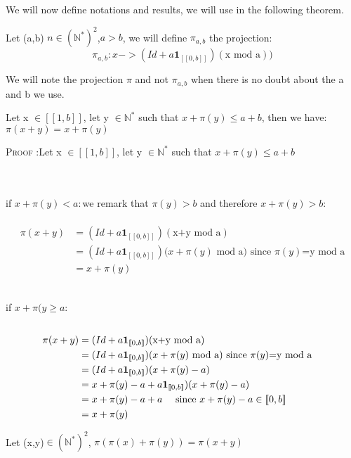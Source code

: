 We will now define notations and results, we will use in the following theorem. 

\begin{notation}

Let (a,b) \(n \in (\mathbb{N}^*)^2\),\(a>b\), we will define \(\pi_{a,b}\) the projection:
\[ \pi_{a,b}:x->(Id+a\mathbf{1}_{ [\![0,b]\!]})(\text{x mod a}))\]
\end{notation}
 
We will note  the projection \(\pi\) and not \(\pi_{a,b}\) when there is no doubt about the a and b we use.

\begin{proposition}
Let x \(\in [\![1,b]\!]\), let y \(\in \mathbb{N}^*\) such that \(x+\pi(y)\leqslant a+b\), then we have: \(\pi(x+y)=x+\pi(y)\)
\end{proposition}

\textsc{Proof :}Let x \(\in [\![1,b]\!]\), let y \(\in \mathbb{N}^*\) such that \(x+\pi(y)\leqslant a+b\)

\\\\if \(x+\pi(y)< a:\)we remark that \(\pi(y)>b\) and therefore \(x+\pi(y)>b\):

\begin{align*}
 \\\pi(x+y) & = (Id+a\mathbf{1}_{ [\![0,b]\!]})(\text{x+y mod a})\\
& = (Id+a\mathbf{1}_{ [\![0,b]\!]})(x+\pi(y)\text{ mod a) since } \pi(y)\text{=y mod a} \\
& =x+ \pi(y)
\end{align*}

\\if \(x+\pi(y\geqslant a\):
\begin{align*}
 \\\pi(x+y) & = (Id+a\mathbf{1}_{ [\![0,b]\!]})(\text{x+y mod a})\\
& = (Id+a\mathbf{1}_{ [\![0,b]\!]})(x+\pi(y)\text{ mod a) since } \pi(y)\text{=y mod a} \\
& = (Id+a\mathbf{1}_{ [\![0,b]\!]})(x+\pi(y) - a) \\
& = x+\pi(y) - a +a\mathbf{1}_{ [\![0,b]\!]})(x+\pi(y) - a) \\
& = x+\pi(y) - a +a \text{ \quad since } x+\pi(y) - a \in [\![0,b]\!] \\
& = x+\pi(y)
\end{align*}


\begin{Proposition}
Let (x,y)\(\in (\mathbb{N}^*)^2\), \(\pi(\pi(x)+\pi(y))=\pi(x+y)\)
\end{Proposition}

